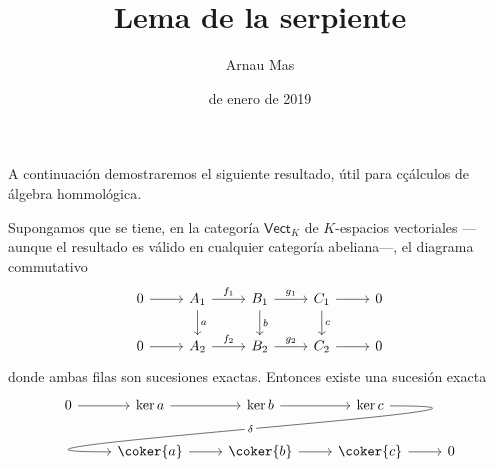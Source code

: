 \documentclass[12pt]{article}
\title{\sffamily {\bfseries Entrega 3:} Lema de la serpiente}
\author{\sffamily Arnau Mas}
\date{\sffamily 19 de enero de 2019}
\begin{document}
\maketitle

A continuación demostraremos el siguiente resultado, útil para cçálculos de álgebra
hommológica.

\begin{serpiente}
Supongamos que se tiene, en la categoría \( \mathsf{Vect}_K \) de \( K \)-espacios
vectoriales ---aunque el resultado es válido en cualquier categoría abeliana---, el
diagrama commutativo
\begin{equation*}
	\begin{tikzcd}
		0 \arrow[r] & A_1 \arrow[r, "f_1"] \arrow[d, "a"] & B_1 \arrow[r, "g_1"] \arrow[d, "b"] & C_1
		\arrow[r] \arrow[d, "c"] & 0 \\
		0 \arrow[r] & A_2 \arrow[r, "f_2"] & B_2 \arrow[r, "g_2"] & C_2 \arrow[r] & 0 
	\end{tikzcd}
\end{equation*}
donde ambas filas son sucesiones exactas. Entonces existe una sucesión exacta
\begin{equation*}
	\begin{tikzcd}
		0 \arrow[r] & \ker{a} \arrow[r] & \ker{b} \arrow[r] & \ker{c} \arrow[dll, "\delta"
		description, out=0, in=180, looseness=2, overlay] \\
			& \coker{a} \arrow[r] & \coker{b} \arrow[r] & \coker{c} \arrow[r] & 0
	\end{tikzcd}
\end{equation*}
\end{serpiente}
\end{document}
